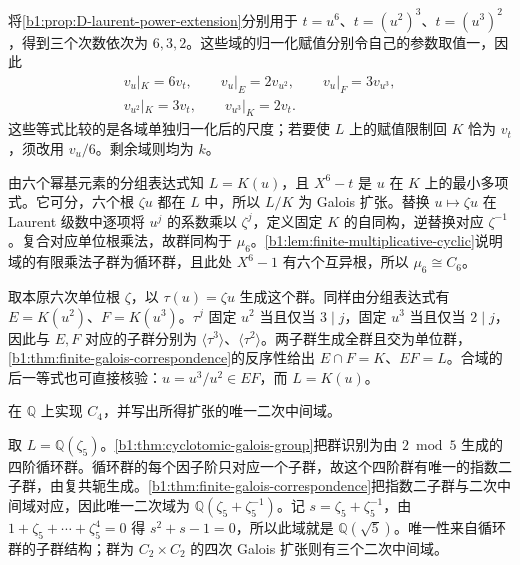 \begin{solution}
	将\cref{b1:prop:D-laurent-power-extension}分别用于 \(t=u^6\)、\(t=(u^2)^3\)、\(t=(u^3)^2\)，得到三个次数依次为 \(6,3,2\)。这些域的归一化赋值分别令自己的参数取值一，因此
	\[
		\begin{gathered}
			v_u|_K=6v_t,\qquad v_u|_E=2v_{u^2},\qquad v_u|_F=3v_{u^3},\\
			v_{u^2}|_K=3v_t,\qquad v_{u^3}|_K=2v_t.
		\end{gathered}
	\]
	这些等式比较的是各域单独归一化后的尺度；若要使 \(L\) 上的赋值限制回 \(K\) 恰为 \(v_t\)，须改用 \(v_u/6\)。剩余域则均为 \(k\)。

	由六个幂基元素的分组表达式知 \(L=K(u)\)，且 \(X^6-t\) 是 \(u\) 在 \(K\) 上的最小多项式。它可分，六个根 \(\zeta u\) 都在 \(L\) 中，所以 \(L/K\) 为 Galois 扩张。替换 \(u\mapsto\zeta u\) 在 Laurent 级数中逐项将 \(u^j\) 的系数乘以 \(\zeta^j\)，定义固定 \(K\) 的自同构，逆替换对应 \(\zeta^{-1}\)。复合对应单位根乘法，故群同构于 \(\mu_6\)。\cref{b1:lem:finite-multiplicative-cyclic}说明域的有限乘法子群为循环群，且此处 \(X^6-1\) 有六个互异根，所以 \(\mu_6\cong C_6\)。

	取本原六次单位根 \(\zeta\)，以 \(\tau(u)=\zeta u\) 生成这个群。同样由分组表达式有 \(E=K(u^2)\)、\(F=K(u^3)\)。\(\tau^j\) 固定 \(u^2\) 当且仅当 \(3\mid j\)，固定 \(u^3\) 当且仅当 \(2\mid j\)，因此与 \(E,F\) 对应的子群分别为 \(\langle\tau^3\rangle\)、\(\langle\tau^2\rangle\)。两子群生成全群且交为单位群，\cref{b1:thm:finite-galois-correspondence}的反序性给出 \(E\cap F=K\)、\(EF=L\)。合域的后一等式也可直接核验：\(u=u^3/u^2\in EF\)，而 \(L=K(u)\)。
\end{solution}

\begin{exercise}\label{b1:ex:D-cyclic-quartic}
	在 \(\mathbb Q\) 上实现 \(C_4\)，并写出所得扩张的唯一二次中间域。
\end{exercise}

\begin{solution}
	取 \(L=\mathbb Q(\zeta_5)\)。\cref{b1:thm:cyclotomic-galois-group}把群识别为由 \(2\bmod5\) 生成的四阶循环群。循环群的每个因子阶只对应一个子群，故这个四阶群有唯一的指数二子群，由复共轭生成。\cref{b1:thm:finite-galois-correspondence}把指数二子群与二次中间域对应，因此唯一二次域为 \(\mathbb Q(\zeta_5+\zeta_5^{-1})\)。记 \(s=\zeta_5+\zeta_5^{-1}\)，由 \(1+\zeta_5+\cdots+\zeta_5^4=0\) 得 \(s^2+s-1=0\)，所以此域就是 \(\mathbb Q(\sqrt5)\)。唯一性来自循环群的子群结构；群为 \(C_2\times C_2\) 的四次 Galois 扩张则有三个二次中间域。
\end{solution}

